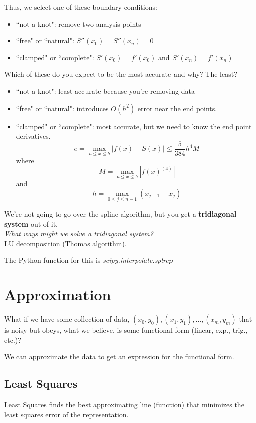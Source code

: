 \documentclass[12pt]{article}
\begin{document}
Thus, we select one of these boundary conditions:
\begin{itemize}
\item ``not-a-knot": remove two analysis points
\item ``free" or ``natural": $S''(x_0) = S''(x_n) = 0$ 
\item ``clamped" or ``complete": $S'(x_0) = f'(x_0)$ and $S'(x_n) = f'(x_n)$ 
\end{itemize}

Which of these do you expect to be the most accurate and why? The least?
\begin{itemize}
\item ``not-a-knot": least accurate because you're removing data
\item ``free" or ``natural": introduces $O(h^2)$ error near the end points.
\item ``clamped" or ``complete": most accurate, but we need to know the end point derivatives.
\[e = \max_{a \leq x \leq b} |f(x) - S(x)| \leq \frac{5}{384}h^4 M\]
where
\[M = \max_{a \leq x \leq b} |f(x)^{(4)}|\]
and
\[h = \max_{0 \leq j \leq n-1} (x_{j+1} - x_{j})\]
\end{itemize}

We're not going to go over the spline algorithm, but you get a \textbf{tridiagonal system} out of it. \\ \textit{What ways might we solve a tridiagonal system?} \\ LU decomposition (Thomas algorithm).

The Python function for this is \textit{scipy.interpolate.splrep}


\section*{Approximation}

What if we have some collection of data, $(x_0, y_0), (x_1, y_1),\dots, (x_m, y_m)$ that is noisy but obeys, what we believe, is some functional form (linear, exp., trig., etc.)?

We can approximate the data to get an expression for the functional form.

\subsection*{Least Squares}
Least Squares finds the best approximating line (function) that minimizes the least squares error of the representation.
\end{document}
